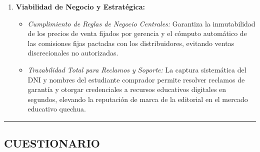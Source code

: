\begin{enumerate}
    \begin{itemize}
        \item \textit{Aprovechamiento de Infraestructura Existente:} El sistema no requiere inversiones inmediatas en nuevo hardware ni en servicios cloud de alta tarificación, dado que se desplegará sobre el servidor VPS de Hostinger (2 vCPU, 8 GB RAM) actualmente subutilizado por la editorial.
        \item \textit{Estructura Presupuestal Sostenible:} El costo total estimado del proyecto asciende a S/ 31,500.00 (cubriendo 1,150 horas-hombre de desarrollo, aseguramiento de la calidad y contingencias), monto recuperable a corto plazo gracias al corte drástico de mermas de inventario y erradicación de errores humanos en la recaudación diaria.
    \end{itemize}
    \item \textbf{Viabilidad de Negocio y Estratégica:}
    \begin{itemize}
        \item \textit{Cumplimiento de Reglas de Negocio Centrales:} Garantiza la inmutabilidad de los precios de venta fijados por gerencia y el cómputo automático de las comisiones fijas pactadas con los distribuidores, evitando ventas discrecionales no autorizadas.
        \item \textit{Trazabilidad Total para Reclamos y Soporte:} La captura sistemática del DNI y nombres del estudiante comprador permite resolver reclamos de garantía y otorgar credenciales a recursos educativos digitales en segundos, elevando la reputación de marca de la editorial en el mercado educativo quechua.
    \end{itemize}
\end{enumerate}

\hrule
\vspace{0.8em}

\subsection{CUESTIONARIO}


